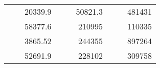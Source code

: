\begin{table}[H]
\begin{tabular}{|ccrccrccc}
\rowcolor[HTML]{DDFDFF} 
\multicolumn{1}{|c|}{\cellcolor[HTML]{FFFFC7}}                                & \multicolumn{1}{c|}{\cellcolor[HTML]{DDFDFF}}                      & \multicolumn{1}{r|}{\cellcolor[HTML]{DAE8FC}20339.9}   & \multicolumn{1}{c|}{\cellcolor[HTML]{FFFFC7}}                                & \multicolumn{1}{c|}{\cellcolor[HTML]{DDFDFF}}                       & \multicolumn{1}{r|}{\cellcolor[HTML]{DDFDFF}50821.3}   & \multicolumn{1}{c|}{\cellcolor[HTML]{FFFFC7}}                                & \multicolumn{1}{c|}{\cellcolor[HTML]{DDFDFF}}                      & \multicolumn{1}{r|}{\cellcolor[HTML]{DDFDFF}481431}    \\ \cline{3-3} \cline{6-6} \cline{9-9} 
\multicolumn{1}{|c|}{\cellcolor[HTML]{FFFFC7}}                                & \multicolumn{1}{c|}{\cellcolor[HTML]{DDFDFF}}                      & \multicolumn{1}{r|}{\cellcolor[HTML]{DDFDFF}58377.6}   & \multicolumn{1}{c|}{\cellcolor[HTML]{FFFFC7}}                                & \multicolumn{1}{c|}{\cellcolor[HTML]{DDFDFF}}                       & \multicolumn{1}{r|}{\cellcolor[HTML]{DAE8FC}210995}    & \multicolumn{1}{c|}{\cellcolor[HTML]{FFFFC7}}                                & \multicolumn{1}{c|}{\cellcolor[HTML]{DDFDFF}}                      & \multicolumn{1}{r|}{\cellcolor[HTML]{DAE8FC}110335}    \\ \cline{3-3} \cline{6-6} \cline{9-9} 
\rowcolor[HTML]{DDFDFF} 
\multicolumn{1}{|c|}{\cellcolor[HTML]{FFFFC7}}                                & \multicolumn{1}{c|}{\cellcolor[HTML]{DDFDFF}}                      & \multicolumn{1}{r|}{\cellcolor[HTML]{DAE8FC}3865.52}   & \multicolumn{1}{c|}{\cellcolor[HTML]{FFFFC7}}                                & \multicolumn{1}{c|}{\cellcolor[HTML]{DDFDFF}}                       & \multicolumn{1}{r|}{\cellcolor[HTML]{DDFDFF}244355}    & \multicolumn{1}{c|}{\cellcolor[HTML]{FFFFC7}}                                & \multicolumn{1}{c|}{\cellcolor[HTML]{DDFDFF}}                      & \multicolumn{1}{r|}{\cellcolor[HTML]{DDFDFF}897264}    \\ \cline{3-3} \cline{6-6} \cline{9-9} 
\multicolumn{1}{|c|}{\cellcolor[HTML]{FFFFC7}}                                & \multicolumn{1}{c|}{\cellcolor[HTML]{DDFDFF}}                      & \multicolumn{1}{r|}{\cellcolor[HTML]{DDFDFF}52691.9}   & \multicolumn{1}{c|}{\cellcolor[HTML]{FFFFC7}}                                & \multicolumn{1}{c|}{\cellcolor[HTML]{DDFDFF}}                       & \multicolumn{1}{r|}{\cellcolor[HTML]{DAE8FC}228102}    & \multicolumn{1}{c|}{\cellcolor[HTML]{FFFFC7}}                                & \multicolumn{1}{c|}{\cellcolor[HTML]{DDFDFF}}                      & \multicolumn{1}{r|}{\cellcolor[HTML]{DAE8FC}309758}    \\ \cline{3-3} \cline{6-6} \cline{9-9} 

\end{tabular}
\end{table}
